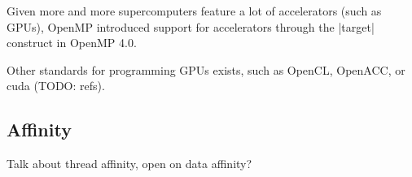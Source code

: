 Given more and more supercomputers feature a lot of accelerators (such as GPUs), OpenMP introduced support for accelerators through the |target| construct in OpenMP 4.0.

Other standards for programming GPUs exists, such as OpenCL, OpenACC, or cuda (TODO: refs).

\subsection{Affinity}

Talk about thread affinity, open on data affinity?

